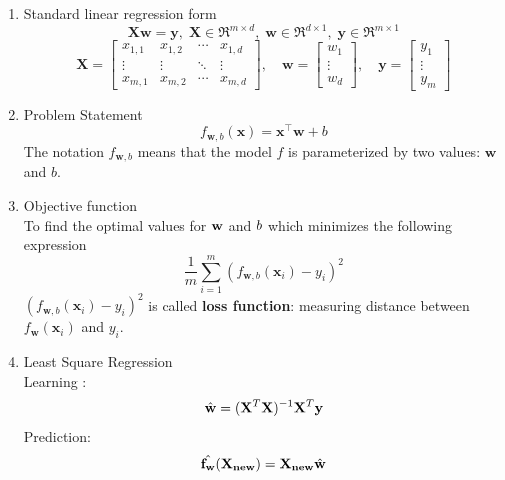 \begin{enumerate}
    \item Standard linear regression form
    \[\mathbf{Xw=y},\; \mathbf{X}\in\Re^{ m\times d},\;\mathbf{w}\in\Re^{d\times 1},\; \mathbf{y}\in\Re^{m\times 1}\]
    \[\mathbf{X} = \begin{bmatrix}x_{1,1} & x_{1,2} & \cdots & x_{1,d} \\\vdots & \vdots & \ddots & \vdots \\x_{m,1} & x_{m,2} &\cdots & x_{m,d}\end{bmatrix}, \quad\mathbf{w} = \begin{bmatrix}w_{1} \\\vdots \\w_{d}\end{bmatrix}, \quad\mathbf{y} = \begin{bmatrix}y_{1} \\\vdots \\y_{m}\end{bmatrix}\]
    \item Problem Statement
    \[f_{\mathbf{w},b}(\mathbf{x}) = \mathbf{x}^\top \mathbf{w} + b\]
    The notation $f_{\mathbf{w},b}$ means that the model $f$ is parameterized by two values: $\mathbf{w}$ and $b$.
    \item Objective function\\
    To find the optimal values for $\mathbf{w\*}$ and $b\*$ which minimizes the following expression
    \[\frac{1}{m} \sum_{i=1}^{m} \left( f_{\mathbf{w},b}(\mathbf{x}_i) - y_i \right)^2\]
    $\left( f_{\mathbf{w},b}(\mathbf{x}_i) - y_i \right)^2$ is called \textbf{loss function}: measuring distance between $f_\mathbf{w}(\mathbf{x}_i)$ and $y_i$.
    \item Least Square Regression \\
    Learning : \[\Hat{\mathbf{w}} = (\mathbf{X}^T\mathbf{X})^{-1}\mathbf{X}^T\mathbf{y}\]
    Prediction: \[\Hat{\mathbf{f_w}}(\mathbf{X_{new}}) = \mathbf{X_{new}}\Hat{\mathbf{w}}\]
\end{enumerate}


